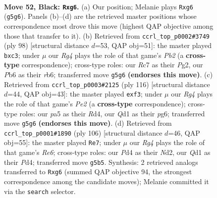 \documentclass[11pt]{article}
\begin{document}
\clearpage

\begin{figure}[p]\centering
\begin{subfigure}{0.46\textwidth}\centering
\resizebox{\linewidth}{!}{%
\newchessgame
\chessboard[
  setfen={8/2r3pk/1p4N1/P5r1/3pp3/6R1/5PK1/3q4 b - - 2 52},
  showmover=false,
  pgfstyle=straightmove, color=movearrow, markmove={g5-g6}
]}
\caption{}
\end{subfigure}\hfill
\begin{subfigure}{0.46\textwidth}\centering
\resizebox{\linewidth}{!}{%
\newchessgame
\chessboard[
  setfen={2R5/8/1r4k1/2p1p2p/2r5/P1n1R2P/1PK3P1/8 w - - 0 50},
  showmover=false,
  pgfstyle=straightmove, color=movearrow, markmove={b2-c3}
]}
\caption{}
\end{subfigure}
\\[4pt]
\begin{subfigure}{0.46\textwidth}\centering
\resizebox{\linewidth}{!}{%
\newchessgame
\chessboard[
  setfen={4r3/R4pk1/6p1/8/3R2P1/5nK1/2r1PP2/8 w - - 0 59},
  showmover=false,
  pgfstyle=straightmove, color=movearrow, markmove={e2-f3}
]}
\caption{}
\end{subfigure}\hfill
\begin{subfigure}{0.46\textwidth}\centering
\resizebox{\linewidth}{!}{%
\newchessgame
\chessboard[
  setfen={8/p7/3nRrk1/1P1P3p/3P2p1/6P1/3N2K1/8 w - - 7 54},
  showmover=false,
  pgfstyle=straightmove, color=movearrow, markmove={e6-e7}
]}
\caption{}
\end{subfigure}
\caption{\textbf{Move 52, Black: \texttt{Rxg6}.} (a) Our position; Melanie plays \texttt{Rxg6} (\texttt{g5g6}). Panels (b)--(d) are the retrieved master positions whose correspondence most drove this move (highest QAP objective among those that transfer to it). (b) Retrieved from \texttt{ccrl\_top\_p0002\#3749} (ply 98) [structural distance $d$=53, QAP obj=51]: the master played \texttt{bxc3}; under $\mu$ our \emph{Rg4} plays the role of that game's \emph{Pb2} (a \textbf{cross-type} correspondence); cross-type roles: our \emph{R}c7 as their \emph{P}g2, our \emph{P}b6 as their \emph{r}b6; transferred move \texttt{g5g6} \textbf{(endorses this move)}. (c) Retrieved from \texttt{ccrl\_top\_p0003\#2125} (ply 116) [structural distance $d$=44, QAP obj=43]: the master played \texttt{exf3}; under $\mu$ our \emph{Rg4} plays the role of that game's \emph{Pe2} (a \textbf{cross-type} correspondence); cross-type roles: our \emph{p}a5 as their \emph{R}d4, our \emph{Q}d1 as their \emph{p}g6; transferred move \texttt{g5g6} \textbf{(endorses this move)}. (d) Retrieved from \texttt{ccrl\_top\_p0001\#1890} (ply 106) [structural distance $d$=46, QAP obj=55]: the master played \texttt{Re7}; under $\mu$ our \emph{Rg4} plays the role of that game's \emph{Re6}; cross-type roles: our \emph{P}d4 as their \emph{N}d2, our \emph{Q}d1 as their \emph{P}d4; transferred move \texttt{g5b5}. Synthesis: 2 retrieved analogs transferred to \texttt{Rxg6} (summed QAP objective 94, the strongest correspondence among the candidate moves); Melanie committed it via the \texttt{search} selector.}
\label{fig:thought-m103}
\end{figure}
\end{document}

